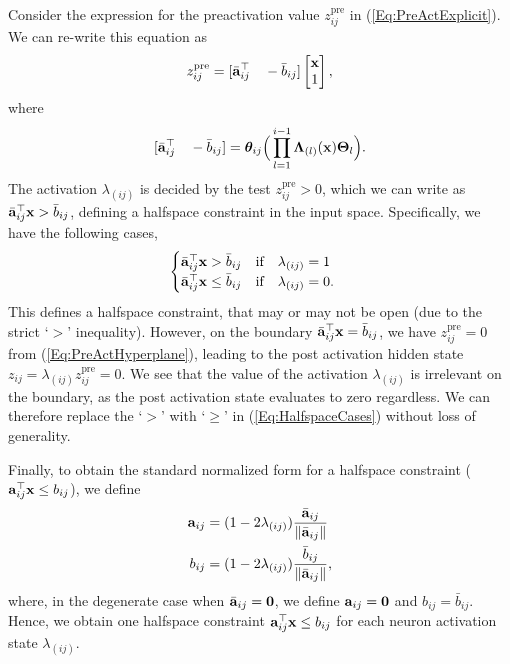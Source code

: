 Consider the expression for the preactivation value $z_{ij}^{\text{pre}}$ in (\ref{Eq:PreActExplicit}). We can re-write this equation as
\begin{align}
\label{Eq:PreActHyperplane}
    z_{ij}^{\text{pre}} = [\bar{\mathbf{a}}_{ij}^\top \quad  -\bar b_{ij}]\begin{bmatrix}
        \mathbf{x}\\
        1
    \end{bmatrix},
\end{align}
where
\begin{align}
\label{Eq:HalfspaceDef}
    [\bar{\mathbf{a}}_{ij}^\top \quad -\bar b_{ij}] = \boldsymbol{\theta}_{ij}\Big(\prod_{l = 1}^{i-1}\mathbf{\Lambda}_{(l)}(\mathbf{x})\mathbf{\Theta}_l\Big).
\end{align} 
The activation $\lambda_{(ij)}$ is decided by the test $z_{ij}^\text{pre} > 0$, which we can write as $\bar{\mathbf{a}}_{ij}^\top\mathbf{x} > \bar b_{ij}$, defining a halfspace constraint in the input space.  Specifically, we have the following cases,
\begin{align}
\label{Eq:HalfspaceCases}
    \begin{cases}
          \bar{\mathbf{a}}_{ij}^{\top} \mathbf{x} > \bar b_{ij} \quad \text{if} \quad  \lambda_{(ij)} = 1 \\    
          \bar{\mathbf{a}}_{ij}^{\top} \mathbf{x} \le \bar b_{ij} \quad \text{if} \quad  \lambda_{(ij)} = 0.
      \end{cases}
\end{align}
This defines a halfspace constraint, that may or may not be open (due to the strict `$>$' inequality). However, on the boundary $\bar{\mathbf{a}}_{ij}^\top\mathbf{x} = \bar b_{ij}$, we have $z_{ij}^{\text{pre}} = 0$ from (\ref{Eq:PreActHyperplane}), leading to the post activation hidden state $z_{ij} = \lambda_{(ij)}z_{ij}^{\text{pre}} = 0$. We see that the value of the activation $\lambda_{(ij)}$ is irrelevant on the boundary, as the post activation state evaluates to zero regardless. We can therefore replace the `$>$' with `$\ge$' in (\ref{Eq:HalfspaceCases}) without loss of generality. 

Finally, to obtain the standard normalized form for a halfspace constraint ($\mathbf{a}_{ij}^\top \mathbf{x} \le b_{ij}$), we define
\begin{subequations}
\begin{align}
    \mathbf{a}_{ij} &= (1-2\lambda_{(ij)})\frac{\bar{\mathbf{a}}_{ij}}{\|\bar{\mathbf{a}}_{ij}\|} \\
    b_{ij} &= (1-2\lambda_{(ij)})\frac{\bar b_{ij}}{\|\bar{\mathbf{a}}_{ij}\|},
\end{align}
\label{eq:normalize}
\end{subequations}
where, in the degenerate case when $\bar{\mathbf{a}}_{ij} = \mathbf{0}$, we define $\mathbf{a}_{ij} = \mathbf{0}$ and $b_{ij} = \bar b_{ij}$. Hence, we obtain one halfspace constraint $\mathbf{a}_{ij}^\top \mathbf{x} \le b_{ij}$ for each neuron activation state $\lambda_{(ij)}$.

